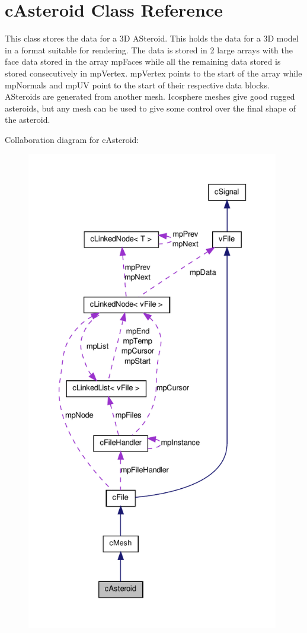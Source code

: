 \hypertarget{classc_asteroid}{
\section{cAsteroid Class Reference}
\label{classc_asteroid}
}


This class stores the data for a 3D ASteroid. This holds the data for a 3D model in a format suitable for rendering. The data is stored in 2 large arrays with the face data stored in the array mpFaces while all the remaining data stored is stored consecutively in mpVertex. mpVertex points to the start of the array while mpNormals and mpUV point to the start of their respective data blocks. ASteroids are generated from another mesh. Icosphere meshes give good rugged asteroids, but any mesh can be used to give some control over the final shape of the asteroid.  




Collaboration diagram for cAsteroid:\nopagebreak
\begin{figure}[H]
\begin{center}
\leavevmode
\includegraphics[height=600pt]{classc_asteroid__coll__graph}
\end{center}
\end{figure}
